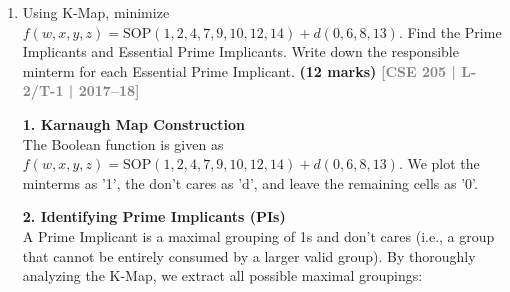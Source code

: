 \documentclass[12pt,a3paper]{article}
\newcommand{\yr}[1]{\hfill\textcolor{gray}{\small\textbf{[#1]}}}
\newcommand{\mk}[1]{\textcolor{orange!70!black}{\small\textbf{(#1 marks)}}}
\begin{document}
\begin{enumerate}
\begin{tcolorbox}[enhanced,breakable,ansbox,colback=cC!4,colframe=cC,boxrule=0.8pt,arc=5pt,title={\textbf{Answer}},fonttitle=\bfseries\color{white},colbacktitle=cC]
The remaining uncovered minterms are $m_{10}, m_{12},$ and $m_{14}$. Looking at our list of available PIs, the single implicant $wz'$ perfectly covers all three of these remaining minterms simultaneously, making it the most optimal choice to complete the function.

\begin{align*}
    f(w,x,y,z) &= \text{EPIs} + \text{Remaining Minimal Cover} \\
    f(w,x,y,z) &= \textcolor{cC}{\mathbf{w'x' + w'y + wz'}}
\end{align*}

\end{tcolorbox}

\item Using K-Map, minimize $f(w,x,y,z) = \mathrm{SOP}(1,2,4,7,9,10,12,14) + d(0,6,8,13)$. Find the Prime Implicants and Essential Prime Implicants. Write down the responsible minterm for each Essential Prime Implicant.
\mk{12} \yr{CSE 205 | L-2/T-1 | 2017--18}

\begin{tcolorbox}[enhanced,breakable,ansbox,colback=cC!4,colframe=cC,boxrule=0.8pt,arc=5pt,title={\textbf{Answer}},fonttitle=\bfseries\color{white},colbacktitle=cC]

\textbf{1. Karnaugh Map Construction} \\
The Boolean function is given as $f(w,x,y,z) = \mathrm{SOP}(1,2,4,7,9,10,12,14) + d(0,6,8,13)$. We plot the minterms as '1', the don't cares as 'd', and leave the remaining cells as '0'. 

\begin{center}
\begin{karnaugh-map}[4][4][1][$yz$][$wx$]
    \autoterms[0]
    
\end{karnaugh-map}
\end{center}

\vspace{0.3cm}
\textbf{2. Identifying Prime Implicants (PIs)} \\
A Prime Implicant is a maximal grouping of 1s and don't cares (i.e., a group that cannot be entirely consumed by a larger valid group). By thoroughly analyzing the K-Map, we extract all possible maximal groupings:


\end{tcolorbox}
\end{enumerate}
\end{document}
